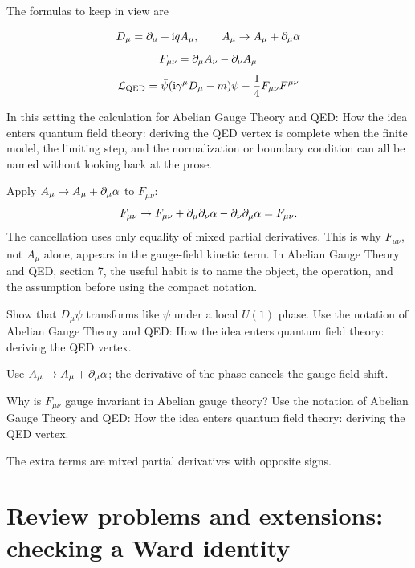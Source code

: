 The formulas to keep in view are

\[
  D_\mu=\partial_\mu+\mathrm i qA_\mu,\qquad A_\mu\to A_\mu+\partial_\mu\alpha
\]
\[
  F_{\mu\nu}=\partial_\mu A_\nu-\partial_\nu A_\mu
\]
\[
  \mathcal L_{\mathrm{QED}}=\bar\psi(\mathrm i\gamma^\mu D_\mu-m)\psi-\frac14F_{\mu\nu}F^{\mu\nu}
\]

In this setting the calculation for Abelian Gauge Theory and QED: How the idea enters quantum field theory: deriving the QED vertex is complete when the finite model, the limiting step, and the normalization or boundary condition can all be named without looking back at the prose.




\begin{example}
Apply \(A_\mu\to A_\mu+\partial_\mu\alpha\) to \(F_{\mu\nu}\):
\[
  F_{\mu\nu}\to F_{\mu\nu}+\partial_\mu\partial_\nu\alpha-\partial_\nu\partial_\mu\alpha=F_{\mu\nu}.
\]
The cancellation uses only equality of mixed partial derivatives.  This is why \(F_{\mu\nu}\), not \(A_\mu\) alone, appears in the gauge-field kinetic term.  In Abelian Gauge Theory and QED, section 7, the useful habit is to name the object, the operation, and the assumption before using the compact notation.
\end{example}



\begin{exercise}
Show that \(D_\mu\psi\) transforms like \(\psi\) under a local \(U(1)\) phase.  Use the notation of Abelian Gauge Theory and QED: How the idea enters quantum field theory: deriving the QED vertex.
\begin{answer}
Use \(A_\mu\to A_\mu+\partial_\mu\alpha\); the derivative of the phase cancels the gauge-field shift.
\end{answer}
\end{exercise}

\begin{exercise}
Why is \(F_{\mu\nu}\) gauge invariant in Abelian gauge theory?  Use the notation of Abelian Gauge Theory and QED: How the idea enters quantum field theory: deriving the QED vertex.
\begin{answer}
The extra terms are mixed partial derivatives with opposite signs.
\end{answer}
\end{exercise}



\section{Review problems and extensions: checking a Ward identity}

